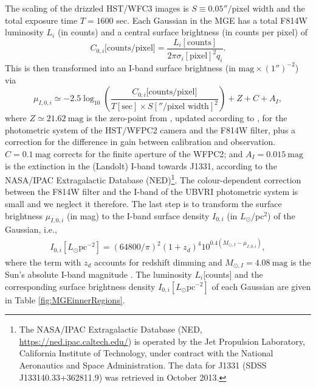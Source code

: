 \documentclass[useAMS,usenatbib]{mnras}
\begin{document}
The scaling of the drizzled HST/WFC3 images is  $S \equiv 0.05''/\text{pixel width}$ and the total exposure time $T = 1600$ sec. Each Gaussian in the MGE has a total F814W luminosity $L_i$ (in counts) and a central surface brightness (in counts per pixel) of
\begin{equation}
C_{0,i}\text{[counts/pixel]} = \frac{L_i[\text{counts}]}{2\pi \sigma_i[\text{pixel}]^2 q_i}.
\end{equation}
This is then transformed into an I-band surface brightness (in $\text{mag}\times(1'')^{-2}$) via
\begin{equation}
\mu_{I,0,i} \simeq -2.5 \log_{10}\left( \frac{C_{0,i}\text{[counts/pixel]}}{T[\text{sec}] \times S[''/\text{pixel width}]^2}\right) + Z + C + A_I, \label{eq:muI_}
\end{equation}
where $Z\simeq21.62~\text{mag}$ is the zero-point from \citet{Holtzman}, updated according to \citet{Dolphin,DolphinNew}, for the photometric system of the HST/WFPC2 camera and the F814W filter, plus a correction for the difference in gain between calibration and observation. $C= 0.1~\text{mag}$ corrects for the finite aperture of the WFPC2; and $A_I =0.015~\text{mag}$ is the extinction in the (Landolt) I-band towards J1331, according to the NASA/IPAC Extragalactic Database (NED)\footnote{The NASA/IPAC Extragalactic Database (NED, \url{https://ned.ipac.caltech.edu/}) is operated by the Jet Propulsion Laboratory, California Institute of Technology, under contract with the National Aeronautics and Space Administration. The data for J1331 (SDSS J133140.33+362811.9) was retrieved in October 2013.}. The colour-dependent correction between the F814W filter and the I-band of the UBVRI photometric system is  small \citep{Holtzman} and we neglect it therefore. The last step is to transform the surface brightness $\mu_{I,0,i}$ (in mag) to the I-band surface density $I_{0,i}$ (in $L_\odot$/pc$^2$) of the Gaussian, i.e.,
\begin{eqnarray}
I_{0,i}[L_\odot \text{pc}^{-2}] = \left( 64800/\pi\right)^2 \left(1+z_d \right)^4 10^{0.4\left(M_{\odot,I}-\mu_{I,0,i} \right)},
\end{eqnarray}
where the term with $z_d$ accounts for redshift dimming and $M_{\odot,I}=4.08~\text{mag}$ is the Sun's absolute I-band magnitude \citep{1998gaas.book.....B}. The luminosity $L_i$[counts] and the corresponding surface brightness density $I_{0,i} [L_\odot \text{pc}^{-2}]$ of each Gaussian are given in Table \ref{fig:MGEinnerRegions}.
\end{document}
